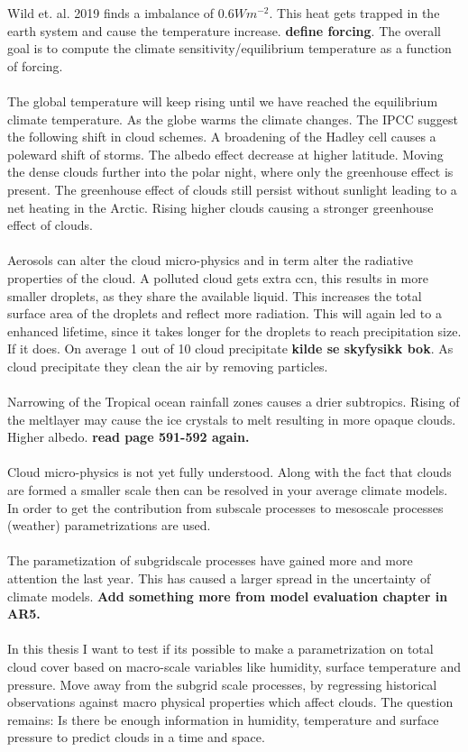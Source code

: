 Wild et. al. 2019 finds a imbalance of $0.6W m^{-2}$. This heat gets trapped in the earth system and cause the temperature increase. \textbf{define forcing}. The overall goal is to compute the climate sensitivity/equilibrium temperature as a function of forcing. 
\\ \\ 
The global temperature will keep rising until we have reached the equilibrium climate temperature. As the globe warms the climate changes. The IPCC suggest the following shift in cloud schemes. A broadening of the Hadley cell causes a poleward shift of storms. The albedo effect decrease at higher latitude. Moving the dense clouds further into the polar night, where only the greenhouse effect is present. The greenhouse effect of clouds still persist without sunlight leading to a net heating in the Arctic. Rising higher clouds causing a stronger greenhouse effect of clouds.
\\ \\
Aerosols can alter the cloud micro-physics and in term alter the radiative properties of the cloud. A polluted cloud gets extra \acrshort{ccn}, this results in more smaller droplets, as they share the available liquid. This increases the total surface area of the droplets and reflect more radiation. This will again led to a enhanced lifetime, since it takes longer for the droplets to reach precipitation size. If it does. On average 1 out of 10 cloud precipitate \textbf{kilde se skyfysikk bok}. As cloud precipitate they clean the air by removing particles.
\\ \\ 
Narrowing of the Tropical ocean rainfall zones causes a drier subtropics. Rising of the meltlayer may cause the ice crystals to melt resulting in more opaque clouds. Higher albedo. \textbf{read page 591-592 again.}
\\ \\
Cloud micro-physics is not yet fully understood. Along with the fact that clouds are formed a smaller scale then can be resolved in your average climate models. In order to get the contribution from subscale processes to mesoscale processes (weather) parametrizations are used. 
\\ \\
The parametization of subgridscale processes have gained more and more attention the last year. This has caused a larger spread in the uncertainty of climate models. \textbf{Add something more from model evaluation chapter in AR5.}
\\ \\ 
In this thesis I want to test if its possible to make a parametrization on total cloud cover based on macro-scale variables like humidity, surface temperature and pressure. Move away from the subgrid scale processes, by regressing historical observations against macro physical properties which affect clouds. The question remains: Is there be enough information in humidity, temperature and surface pressure to predict clouds in a time and space. 
